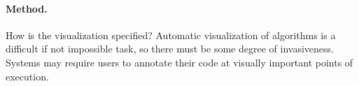 
\paragraph{Method.} How is the visualization specified? Automatic visualization
of algorithms is a difficult if not impossible task, so there must be some
degree of invasiveness. Systems may require users to annotate their code at
visually important points of execution.

